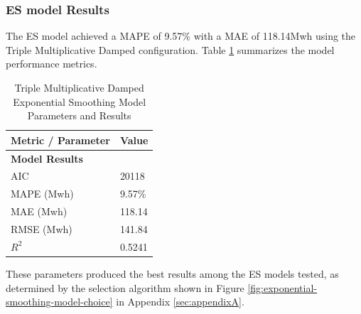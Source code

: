\subsubsection{ES model Results}
The ES model achieved a MAPE of 9.57\% with a MAE of 118.14Mwh using the Triple Multiplicative Damped configuration. Table \ref{tab:exp_smoothing_results} summarizes the model performance metrics. 
\begin{table}[h!]
	\centering
	\caption{Triple Multiplicative Damped Exponential Smoothing Model Parameters and Results}
	\label{tab:exp_smoothing_results}
	\begin{tabular}{ll}
		\hline
		\textbf{Metric / Parameter} & \textbf{Value} \\
		\hline
		\multicolumn{2}{l}{\textbf{Model Results}} \\
		AIC & 20118 \\
		MAPE (Mwh) &  9.57\% \\
		MAE (Mwh) & 118.14 \\
		RMSE (Mwh) & 141.84 \\
		$R^2$ & 0.5241\\
		\hline
	\end{tabular}
\end{table}
These parameters produced the best results among the ES models tested, as determined by the selection algorithm shown in Figure \ref{fig:exponential-smoothing-model-choice} in Appendix \ref{sec:appendixA}.
